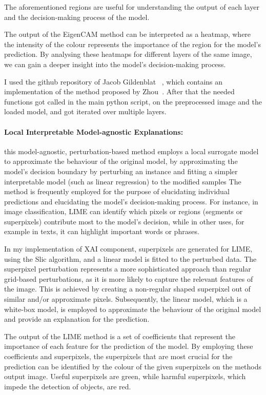The aforementioned regions are useful for understanding the output of each layer and the decision-making process of the model.

The output of the EigenCAM method can be interpreted as a heatmap, where the intensity of the colour represents the importance of
the region for the model's prediction.
By analysing these heatmaps for different layers of the same image, we can gain a deeper insight into the model's decision-making process.

I used the github repository of Jacob Gildenblat~\cite{jacobgilpytorchcam}
, which contains an implementation of the method proposed by Zhou~\cite{Zhou_2016}.
After that the needed functions got called in the main python script, on the preprocessed image and the loaded model, and got iterated over multiple layers.

\paragraph{Local Interpretable Model-agnostic Explanations:}\label{par:lime}

this model-agnostic, perturbation-based method employs a local surrogate model to approximate the behaviour of the original model, by
approximating the model's decision boundary by perturbing an instance and fitting a simpler interpretable model (such as linear regression) to the modified samples
The method is frequently employed for the purpose of elucidating individual predictions and elucidating the model's decision-making process. For instance, in image classification, LIME can identify which pixels or regions (segments or superpixels) contribute most to the model's decision, while in other uses, for example in texts, it can highlight important words or phrases.

In my implementation of XAI component,  superpixels are generated for LIME, using the Slic algorithm, and a linear model is fitted to the perturbed data.
The superpixel perturbation represents a more sophisticated approach than regular grid-based perturbations, as it is more likely to capture the relevant features of the image.
This is achieved by creating a non-regular shaped superpixel out of similar and/or approximate pixels.
Subsequently, the linear model, which is a white-box model, is employed to approximate the behaviour of the original model and provide an explanation for the prediction.

The output of the LIME method is a set of coefficients that represent the importance of each feature for the prediction of the model.
By employing these coefficients and superpixels, the superpixels that are most crucial for the prediction can be identified by the
colour of the given superpixels on the methods output image.
Useful superpixels are green, while harmful superpixels, which impede the detection of objects, are red.


